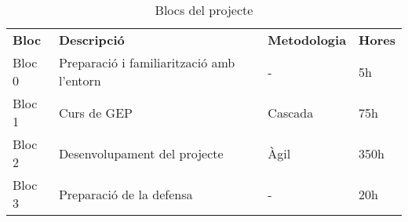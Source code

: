 \begin{table}[H]
	\begin{center}
		\begin{tabular}{l p{8cm} l l }
			\textbf{Bloc} & \textbf{Descripció} & \textbf{Metodologia} & \textbf{Hores} \\
			Bloc 0 & Preparació i familiarització amb l'entorn & - & 5h \\
			Bloc 1 & Curs de GEP & Cascada & 75h \\
			Bloc 2 & Desenvolupament del projecte & Àgil & 350h \\
			Bloc 3 & Preparació de la defensa & - & 20h \\
		\end{tabular}
	\end{center}
	\caption{Blocs del projecte}
\end{table}
